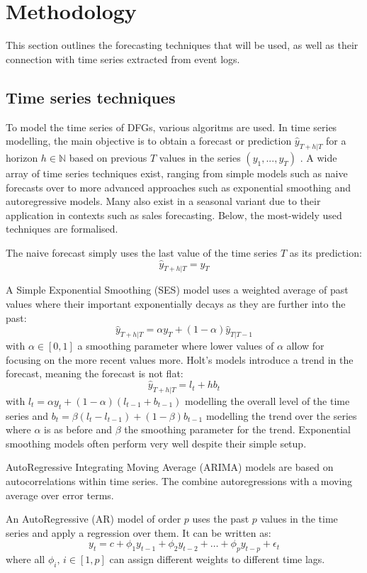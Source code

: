 \section{Methodology}\label{sec:methodology}
This section outlines the forecasting techniques that will be used, as well as their connection with time series extracted from event logs.

\subsection{Time series techniques}
To model the time series of DFGs, various algoritms are used.
In time series modelling, the main objective is to obtain a forecast or prediction $\hat{y}_{T+h|T}$ for a horizon $h\in \mathbb{N}$ based on previous $T$ values in the series $(y_1,...,y_T)$ \cite{hyndman2018forecasting}.
A wide array of time series techniques exist, ranging from simple models such as naive forecasts over to more advanced approaches such as exponential smoothing and autoregressive models.
Many also exist in a seasonal variant due to their application in contexts such as sales forecasting.
Below, the most-widely used techniques are formalised.

The naive forecast simply uses the last value of the time series $T$ as its prediction:
\[\hat{y}_{T+h|T}=y_T\]

A Simple Exponential Smoothing (SES) model uses a weighted average of past values where their important exponentially decays as they are further into the past:
\[\hat{y}_{T+h|T}=\alpha y_T + (1-\alpha)\hat{y}_{T|T-1}\]
with $\alpha \in [0,1]$ a smoothing parameter where lower values of $\alpha$ allow for focusing on the more recent values more.
Holt's models introduce a trend in the forecast, meaning the forecast is not flat:
\[\hat{y}_{T+h|T}=l_t + hb_t\]
with $l_t = \alpha y_t + (1-\alpha)(l_{t-1}+b_{t-1})$ modelling the overall level of the time series and $b_t=\beta(l_t-l_{t-1})+(1-\beta)b_{t-1}$ modelling the trend over the series where $\alpha$ is as before and $\beta$ the smoothing parameter for the trend.
Exponential smoothing models often perform very well despite their simple setup.

AutoRegressive Integrating Moving Average (ARIMA) models are based on autocorrelations within time series. 
The combine autoregressions with a moving average over error terms.

An AutoRegressive (AR) model of order $p$ uses the past $p$ values in the time series and apply a regression over them. 
It can be written as:
\[y_t=c+\phi_1 y_{t-1} + \phi_2 y_{t-2} + \dots + \phi_p y_{t-p} + \epsilon_t\]
where all $\phi_i,\, i\in[1,p]$ can assign different weights to different time lags.

